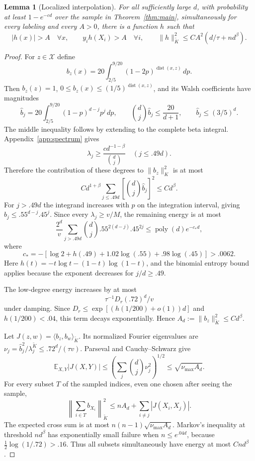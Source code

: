 \documentclass[11pt]{article}
\newtheorem{lemma}[theorem]{Lemma}
\theoremstyle{remark}\newtheorem{remark}[theorem]{Remark}
\DeclareMathOperator{\dist}{dist}
\newcommand{\E}{\mathbb E}
\begin{document}
\begin{lemma}[Localized interpolation]\label{lem:bump}
For all sufficiently large $d$, with probability at least $1-e^{-cd}$ over the sample in Theorem~\ref{thm:main}, simultaneously for every labeling and every $A>0$, there is a function $h$ such that
\[
 |h(x)|>A\quad\forall x,\qquad y_i h(X_i)>A\quad\forall i,
 \qquad \|h\|_{\widetilde K}^2\le C A^2(d/\tau+nd^\beta).
\]
\end{lemma}
\begin{proof}
For $z\in\mathcal X$ define
\[
 b_z(x)=20\int_{2/5}^{9/20}(1-2p)^{\dist(x,z)}\,dp.
\]
Then $b_z(z)=1$, $0\le b_z(x)\le(1/5)^{\dist(x,z)}$, and its Walsh coefficients have magnitudes
\[
 \widehat b_j=20\int_{2/5}^{9/20}(1-p)^{d-j}p^j\,dp,
 \qquad \binom dj\widehat b_j\le\frac{20}{d+1},\qquad \widehat b_j\le(3/5)^d.
\]
The middle inequality follows by extending to the complete beta integral. Appendix~\ref{app:spectrum} gives
\[
 \lambda_j\ge\frac{c d^{-1-\beta}}{\binom dj}\quad(j\le .49d).
\]
Therefore the contribution of these degrees to $\|b_z\|_K^2$ is at most
\[
 C d^{1+\beta}\sum_{j\le .49d}\left[\binom dj\widehat b_j\right]^2\le C d^\beta.
\]
For $j>.49d$ the integrand increases with $p$ on the integration interval, giving $\widehat b_j\le .55^{d-j}.45^j$. Since every $\lambda_j\ge v/M$, the remaining energy is at most
\[
 \frac{2^d}{v}\sum_{j>.49d}\binom dj .55^{2(d-j)}.45^{2j}\le \operatorname{poly}(d)e^{-c_*d},
\]
where
\[
 c_*=-[\log2+h(.49)+1.02\log(.55)+.98\log(.45)]>.0062.
\]
Here $h(t)=-t\log t-(1-t)\log(1-t)$, and the binomial entropy bound applies because the exponent decreases for $j/d\ge .49$.

The low-degree energy increases by at most
\[
 \tau^{-1}D_r( .72)^d/v
\]
under damping. Since $D_r\le\exp[(h(1/200)+o(1))d]$ and $h(1/200)<.04$, this term decays exponentially. Hence $A_d:=\|b_z\|_{\widetilde K}^2\le Cd^\beta$.

Let $J(z,w)=\langle b_z,b_w\rangle_{\widetilde K}$. Its normalized Fourier eigenvalues are $\nu_j=\widehat b_j^2/\lambda^{\widetilde K}_j\le .72^d/(\tau v)$. Parseval and Cauchy--Schwarz give
\[
 \E_{X,Y}|J(X,Y)|\le\left(\sum_j\binom dj\nu_j^2\right)^{1/2}
 \le\sqrt{\nu_{\max} A_d}.
\]
For every subset $T$ of the sampled indices, even one chosen after seeing the sample,
\[
 \left\|\sum_{i\in T}b_{X_i}\right\|_{\widetilde K}^2
 \le nA_d+\sum_{i\ne j}|J(X_i,X_j)|.
\]
The expected cross sum is at most $n(n-1)\sqrt{\nu_{\max}A_d}$. Markov's inequality at threshold $nd^\beta$ has exponentially small failure when $n\le e^{.04d}$, because $\tfrac12\log(1/.72)>.16$. Thus all subsets simultaneously have energy at most $Cnd^\beta$.


\end{proof}
\end{document}
